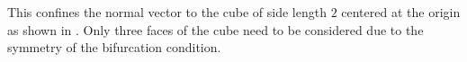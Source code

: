 \documentclass[12pt]{article}
\numberwithin{equation}{section}
\begin{document}
This confines the normal vector to the cube of side length $2$
centered at the origin as shown in . Only three
faces of the cube need to be considered due to the symmetry of the
bifurcation condition.

\begin{figure}[!htbp]
  \begin{center}
    \unitlength=1.0mm
\end{center}
\end{figure}
\end{document}
